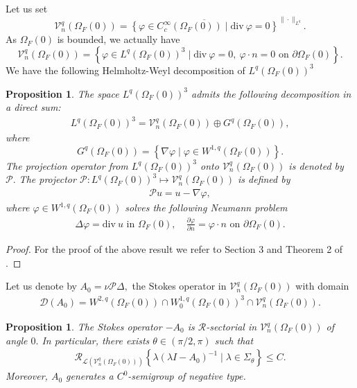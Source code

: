 \documentclass[12pt,a4paper,reqno]{amsart}
\newtheorem{proposition}[theorem]{Proposition}
\theoremstyle{definition}
\theoremstyle{remark}
\numberwithin{equation}{section}
\newcommand{\ofo}{\Omega_{F}(0)}
\newcommand{\mr}{\mathcal{R}}
\newcommand{\mpp}{\mathcal{P}}
\newcommand{\mv}{\mathcal{V}}
\begin{document}
Let us set
\begin{equation*}
 \mathcal{V}^q_{n} (\ofo)  = \overline{\left\{ \varphi \in C^{\infty}_{c}(\ofo) \mid \mathrm{div} \ \varphi = 0 \right\}}^{\|\cdot\|_{L^{q}}}.
\end{equation*}
As $\ofo$ is bounded, we actually have
\begin{equation*}
\mathcal{V}^q_{n} (\ofo)= \left \{\varphi \in { L}^q(\ofo)^{3} \mid \mathrm{div} \ \varphi = 0, \ \varphi \cdot { n} = 0 \mbox{ on }
 \partial\ofo\right\}.
\end{equation*}
We  have the following Helmholtz-Weyl decomposition of $L^{q}(\ofo)^{3}$ 
\begin{proposition} \label{hw}
The space ${ L}^q(\ofo)^{3}$ admits the following decomposition in a direct sum:
\begin{align*}
  {L}^q(\ofo)^{3} = \mv^q_{n}(\ofo) \oplus G^{q}(\ofo),
\end{align*}
where
\begin{equation*}
G^{q}(\ofo) =  \left\{ \nabla \varphi \mid \varphi \in W^{1,q}(\ofo)\right\}.
\end{equation*}
The  projection operator from ${ L}^q(\ofo)^{3}$ onto $\mv^q_{n}(\ofo)$ is denoted by $\mpp.$  The projector
$\mpp:{ L}^q(\ofo)^{3} \mapsto \mv^q_{n}(\ofo)$ is defined by
\begin{align*}
 \mpp u  = u - \nabla \varphi,
\end{align*}
where $\varphi \in W^{1,q}(\ofo)$ solves the following Neumann problem
\begin{align*}
 \Delta \varphi = \mathrm{div} \ u  \mbox{ in } \ofo, \quad \frac{\partial \varphi}{\partial n} = \varphi \cdot n \mbox{ on } \partial\ofo.
\end{align*}
\end{proposition}
\begin{proof}
For the proof of the above result we refer to Section 3 and Theorem 2 of 
\cite{Fujiwara}.
\end{proof}
Let us denote by $A_{0} = \nu \mpp \Delta,$ the Stokes operator in $\mv^{q}_{n}(\ofo)$ with domain
\begin{align*}
\mathcal{D}(A_{0}) =  W^{2,q}(\ofo) \cap W^{1,q}_{0}(\ofo)^{3} \cap \mathcal{V}^q_{n} (\ofo).
\end{align*}
\begin{proposition} \label{prop:rsecS}
The Stokes operator $-A_{0}$ is ${\mathcal R}$-sectorial in $\mv^{q}_{n}(\ofo)$ of angle $0.$  In particular, there exists $\theta \in (\pi/2, \pi)$ such that
\begin{align}
\mr_{\mathcal{L}(\mv^{q}_{n}(\ofo))} \left\{ \lambda(\lambda I - A_{0})^{-1} \mid \lambda \in  \Sigma_{\theta} \right\} \leqslant C.
\end{align}
Moreover, $A_{0}$ generates a $C^{0}$-semigroup of negative type.
\end{proposition}
\end{document}
